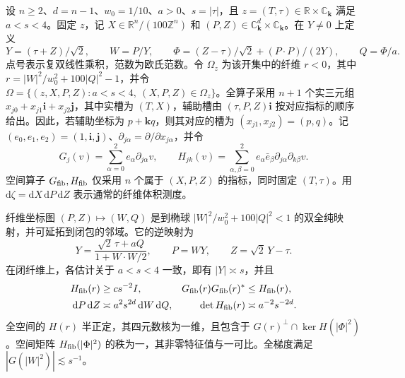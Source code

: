 设 $n\ge2$、$d=n-1$、$w_0=1/10$、$a>0$、$s=|\tau|$，且 $z=(T,\tau)\in\mathbb R\times\mathbb C_{\mathbf k}$ 满足 $a<s<4$。固定 $z$，记 $X\in\mathbb R^n/(100\mathbb Z^n)$ 和 $(P,Z)\in\mathbb C_{\mathbf k}^d\times\mathbb C_{\mathbf k}$。在 $Y\ne0$ 上定义
\[
 Y=(\tau+Z)/\sqrt 2,\qquad W=P/Y,\qquad
 \Phi=(Z-\tau)/\sqrt 2+(P\cdot P)/(2Y),\qquad Q=\Phi/a .
\]
点号表示复双线性乘积，范数为欧氏范数。令 $\Omega_z$ 为该开集中的纤维 $r<0$，其中 $r=|W|^2/w_0^2+100|Q|^2-1$，并令 $\Omega=\{(z,X,P,Z):a<s<4,\ (X,P,Z)\in\Omega_z\}$。全算子采用 $n+1$ 个实三元组 $x_{j0}+x_{j1}\mathbf i+x_{j2}\mathbf j$，其中实槽为 $(T,X)$，辅助槽由 $(\tau,P,Z)\mathbf i$ 按对应指标的顺序给出。因此，若辅助坐标为 $p+\mathbf kq$，则其对应的槽为 $(x_{j1},x_{j2})=(p,q)$。记 $(e_0,e_1,e_2)=(1,\mathbf i,\mathbf j)$、$\partial_{j\alpha}=\partial/\partial x_{j\alpha}$，并令
\[
G_j(v)=\sum_{\alpha=0}^2 e_\alpha\partial_{j\alpha}v,\qquad
H_{jk}(v)=\sum_{\alpha,\beta=0}^2 e_\alpha\bar e_\beta\partial_{j\alpha}\partial_{k\beta}v.
\]
空间算子 $G_{\rm fib},H_{\rm fib}$ 仅采用 $n$ 个属于 $(X,P,Z)$ 的指标，同时固定 $(T,\tau)$。用 $\mathrm d\zeta=\mathrm dX\,\mathrm dP\,\mathrm dZ$ 表示通常的纤维体积测度。

纤维坐标图 $(P,Z)\mapsto(W,Q)$ 是到椭球 $|W|^2/w_0^2+100|Q|^2<1$ 的双全纯映射，并可延拓到闭包的邻域。它的逆映射为
\[
 Y=\frac{\sqrt 2\,\tau+aQ}{1+W\cdot W/2},\qquad P=WY,\qquad Z=\sqrt 2\,Y-\tau .
\]
在闭纤维上，各估计关于 $a<s<4$ 一致，即有 $|Y|\asymp s$，并且
\begin{align*}
 H_{\rm fib}(r)&\ge c s^{-2}I,
 &G_{\rm fib}(r)G_{\rm fib}(r)^*&\le H_{\rm fib}(r),\\
 \mathrm dP\,\mathrm dZ&\asymp a^2s^{2d}\,\mathrm dW\,\mathrm dQ,
 &\det H_{\rm fib}(r)&\asymp a^{-2}s^{-2d}.
\end{align*}全空间的 $H(r)$ 半正定，其四元数核为一维，且包含于 $G(r)^\perp\cap\ker H(|\Phi|^2)$。空间矩阵 $H_{\rm fib}(|\Phi|^2)$ 的秩为一，其非零特征值与一可比。全梯度满足 $|G(|W|^2)|\lesssim s^{-1}$。
